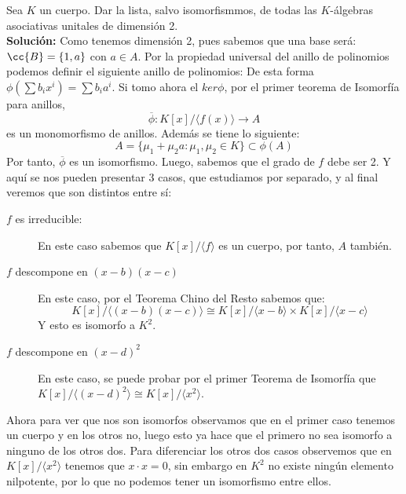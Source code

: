 \begin{ejerciciostarstar}
    Sea $K$ un cuerpo. Dar la lista, salvo isomorfismmos, de todas las $K$-álgebras asociativas unitales de dimensión 2. \\
    
    \noindent
    \textbf{Solución:}
    Como tenemos dimensión 2, pues sabemos que una base será: $\cc{B} = \{1, a\}$ con $a \in A$. Por la propiedad universal del anillo de polinomios podemos definir el siguiente anillo de polinomios:
    De esta forma $\phi(\sum b_ix^i) = \sum b_ia^i$. Si tomo ahora el $ker\phi$, por el primer teorema de Isomorfía para anillos, 
    \begin{equation*}
        \overline{\phi} : K[x] / \langle f(x) \rangle \to A
    \end{equation*}
    es un monomorfismo de anillos. Además se tiene lo siguiente:
    \begin{equation*}
        A = \{\mu_1 + \mu_2a : \mu_1,\mu_2 \in K\} \subset \phi(A)
    \end{equation*}
    Por tanto, $\overline{\phi}$ es un isomorfismo. Luego, sabemos que el grado de $f$ debe ser 2. Y aquí se nos pueden presentar 3 casos, que estudiamos por separado, y al final veremos que son distintos entre sí:
    \begin{description}
        \item [$f$ es irreducible:] En este caso sabemos que $K[x]/\langle f \rangle$ es un cuerpo, por tanto, $A$ también.  
        \item [$f$ descompone en $(x-b)(x-c)$] En este caso, por el Teorema Chino del Resto sabemos que:
            \begin{equation*}
                K[x]/\langle (x-b)(x-c) \rangle \cong K[x]/\langle x-b \rangle \times K[x]/\langle x-c \rangle
            \end{equation*}
            Y esto es isomorfo a $K^2$. 
        \item [$f$ descompone en $(x-d)^2$] En este caso, se puede probar por el primer Teorema de Isomorfía que $K[x]/\langle (x-d)^2 \rangle \cong K[x]/\langle x^2 \rangle$. 
    \end{description}

    Ahora para ver que nos son isomorfos observamos que en el primer caso tenemos un cuerpo y en los otros no, luego esto ya hace que el primero no sea isomorfo a ninguno de los otros dos. Para diferenciar los otros dos casos observemos que en $K[x]/\langle x^2 \rangle$ tenemos que $x \cdot x = 0$, sin embargo en $K^2$ no existe ningún elemento nilpotente, por lo que no podemos tener un isomorfismo entre ellos. 

\end{ejerciciostarstar}

